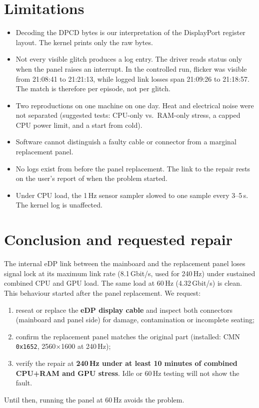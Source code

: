 \documentclass[11pt,a4paper]{article}
\newcommand{\reg}[1]{\texttt{#1}}
\begin{document}
\section{Limitations}
\begin{itemize}
\item Decoding the DPCD bytes is our interpretation of the DisplayPort register layout. The kernel prints only the raw bytes.
\item Not every visible glitch produces a log entry. The driver reads status only when the panel raises an interrupt. In the
controlled run, flicker was visible from 21:08:41 to 21:21:13, while logged link losses span 21:09:26 to 21:18:57. The
match is therefore per episode, not per glitch.
\item Two reproductions on one machine on one day. Heat and electrical noise were not separated (suggested tests: CPU-only vs.\
RAM-only stress, a capped CPU power limit, and a start from cold).
\item Software cannot distinguish a faulty cable or connector from a marginal replacement panel.
\item No logs exist from before the panel replacement. The link to the repair rests on the user's report of when the problem started.
\item Under CPU load, the 1\,Hz sensor sampler slowed to one sample every 3--5\,s. The kernel log is unaffected.
\end{itemize}

\section{Conclusion and requested repair}
The internal eDP link between the mainboard and the replacement panel loses signal lock at its maximum link rate (8.1\,Gbit/s,
used for 240\,Hz) under sustained combined CPU and GPU load. The same load at 60\,Hz (4.32\,Gbit/s) is clean. This behaviour started after
the panel replacement. We request:
\begin{enumerate}
\item reseat or replace the \textbf{eDP display cable} and inspect both connectors (mainboard and panel side) for damage,
contamination or incomplete seating;
\item confirm the replacement panel matches the original part (installed: CMN \reg{0x1652}, 2560$\times$1600 at 240\,Hz);
\item verify the repair at \textbf{240\,Hz under at least 10 minutes of combined CPU+RAM and GPU stress}. Idle or 60\,Hz testing will not show the fault.
\end{enumerate}
Until then, running the panel at 60\,Hz avoids the problem.
\end{document}
